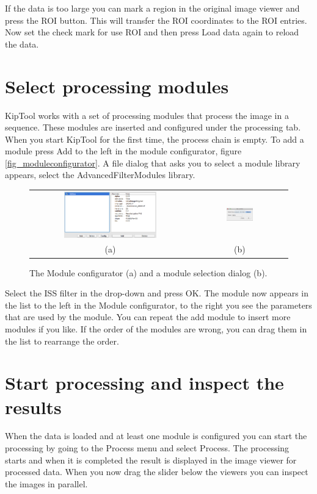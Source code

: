 \documentclass[a4paper]{scrreprt}
\begin{document}
If the data is too large you can mark a region in the original image viewer and press the ROI button. This will transfer the ROI coordinates to the ROI entries. Now set the check mark for use ROI and then press Load data again to reload the data.
 
\section{Select processing modules}
KipTool works with a set of processing modules that process the image in a sequence. These modules are inserted and configured under the processing tab. When you start KipTool for the first time, the process chain is empty. To add a module press Add to the left in the module configurator, figure \ref{fig_moduleconfigurator}. A file dialog that asks you to select a module library appears, select the AdvancedFilterModules library. 
\begin{figure}[ht!]
\centering
\begin{tabular}{cc}
\includegraphics[width=0.6\textwidth]{figures/ModuleConfigurator.png} &
\includegraphics[width=0.3\textwidth]{figures/ModuleSelectionDlg.png} \\
(a) & (b)
\end{tabular}
\caption{The Module configurator (a) and a module selection dialog (b).}
\label{ref_moduleconfigurator}
\end{figure}
Select the ISS filter in the drop-down and press OK. The module now appears in the list to the left in the Module configurator, to the right you see the parameters that are used by the module. You can repeat the add module to insert more modules if you like. If the order of the modules are wrong, you can drag them in the list to rearrange the order.

\section{Start processing and inspect the results}
When the data is loaded and at least one module is configured you can start the processing by going to the Process menu and select Process. The processing starts and when it is completed the result is displayed in the image viewer for processed data. When you now drag the slider below the viewers you can inspect the images in parallel.  
\end{document}
